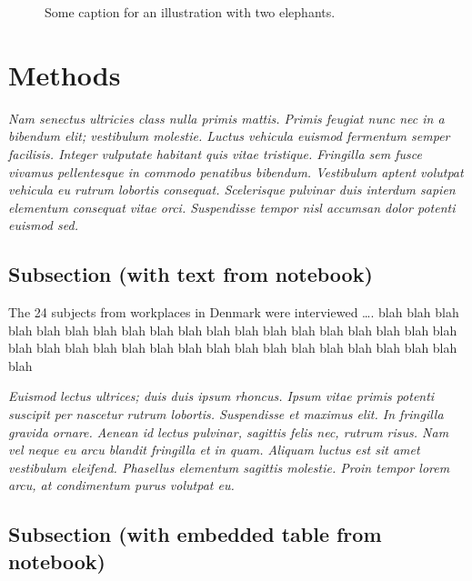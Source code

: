 \documentclass[
  a4paper,
]{scrbook}
\begin{document}
\begin{figure}
\begin{minipage}{0.50\linewidth}
{}

\subcaption{\label{fig-hanno}}

\end{minipage}%

\caption{\label{fig-twoelephants}Some caption for an illustration with
two elephants.}

\end{figure}%

\chapter{Methods}\label{methods}

\emph{Nam senectus ultricies class nulla primis mattis. Primis feugiat
nunc nec in a bibendum elit; vestibulum molestie. Luctus vehicula
euismod fermentum semper facilisis. Integer vulputate habitant quis
vitae tristique. Fringilla sem fusce vivamus pellentesque in commodo
penatibus bibendum. Vestibulum aptent volutpat vehicula eu rutrum
lobortis consequat. Scelerisque pulvinar duis interdum sapien elementum
consequat vitae orci. Suspendisse tempor nisl accumsan dolor potenti
euismod sed.}

\section{Subsection (with text from
notebook)}\label{subsection-with-text-from-notebook}

\label{doc-sampling}
The 24 subjects from workplaces in Denmark were interviewed \ldots. blah
blah blah blah blah blah blah blah blah blah blah blah blah blah blah
blah blah blah blah blah blah blah blah blah blah blah blah blah blah
blah blah blah blah blah blah blah

\emph{Euismod lectus ultrices; duis duis ipsum rhoncus. Ipsum vitae
primis potenti suscipit per nascetur rutrum lobortis. Suspendisse et
maximus elit. In fringilla gravida ornare. Aenean id lectus pulvinar,
sagittis felis nec, rutrum risus. Nam vel neque eu arcu blandit
fringilla et in quam. Aliquam luctus est sit amet vestibulum eleifend.
Phasellus elementum sagittis molestie. Proin tempor lorem arcu, at
condimentum purus volutpat eu.}

\section{Subsection (with embedded table from
notebook)}\label{subsection-with-embedded-table-from-notebook}
\end{document}
